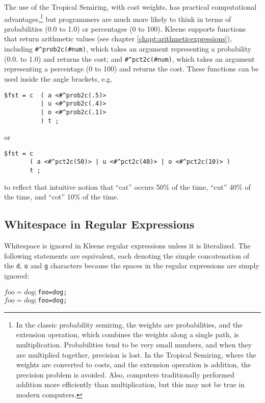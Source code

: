 The use of the Tropical Semiring, with cost weights, has practical computational
advantages,\footnote{In the classic probability semiring, the weights are probabilities, and the extension
operation, which combines the weights along a single path, is multiplication.  Probabilities tend to be very small numbers, and when they are multiplied
together, precision is lost.  In the Tropical Semiring, where the weights are converted to costs, and the
extension operation is addition, the precision problem is avoided.  Also, computers traditionally
performed addition more efficiently than multiplication, but this may not be true in modern computers.} but programmers are much more likely to think in terms of
probabilities (0.0 to 1.0) or percentages (0 to 100).  Kleene supports functions that return arithmetic
values (see chapter \ref{chapt:arithmeticexpressions}), including \verb!#^prob2c(#num)!,
which takes an argument representing a probability
(0.0. to 1.0) and returns the cost; and \verb!#^pct2c(#num)!, which takes an argument
representing a percentage
(0 to 100) and returns the cost.  These functions can be used inside the angle brackets, e.g.


\begin{Verbatim}
$fst = c  ( a <#^prob2c(.5)> 
          | u <#^prob2c(.4)> 
          | o <#^prob2c(.1)> 
          ) t ;
\end{Verbatim}

\noindent
or

\begin{Verbatim}
$fst = c  
       ( a <#^pct2c(50)> | u <#^pct2c(40)> | o <#^pct2c(10)> ) 
       t ;
\end{Verbatim}

\noindent
to reflect that intuitive notion that ``cat'' occurs 50\% of the time, ``cut'' 40\% of the time, and ``cot''
10\% of the time.


\subsection{Whitespace in Regular Expressions}
 
Whitespace is ignored in Kleene regular expressions unless it is
literalized.  The following statements are equivalent, each denoting the
simple concatenation of the \texttt{d}, \texttt{o} and \texttt{g}
characters because the
spaces in the regular expressions are simply ignored:

\begin{alltt}
$foo = dog ;
$foo = do g ;
$foo = d og ;
$foo = d o g ;
\end{alltt}

